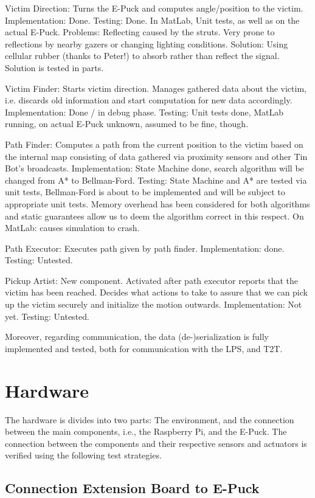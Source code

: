\documentclass[a4paper,parskip,headheight=38pt]{scrartcl} %
\newcommand{\ie}{i.e.}
\begin{document}
Victim Direction:
Turns the E-Puck and computes angle/position to the victim.
Implementation: Done.
Testing: Done. In MatLab, Unit tests, as well as on the actual E-Puck. Problems: Reflecting caused by the struts. Very prone to reflections by nearby gazers or changing lighting conditions. Solution: Using cellular rubber (thanks to Peter!) to absorb rather than reflect the signal. Solution is tested in parts.

Victim Finder: 
Starts victim direction. Manages gathered data about the victim, i.e. discards old information and start computation for new data accordingly.
Implementation: Done / in debug phase. 
Testing: Unit tests done, MatLab running, on actual E-Puck unknown, assumed to be fine, though.

Path Finder: 
Computes a path from the current position to the victim based on the internal map consisting of data gathered via proximity sensors and other Tin Bot's broadcasts.
Implementation: State Machine done, search algorithm will be changed from A* to Bellman-Ford.
Testing: State Machine and A* are tested via unit tests, Bellman-Ford is about to be implemented and will be subject to appropriate unit tests. Memory overhead has been considered for both algorithms and static guarantees allow us to deem the algorithm correct in this respect. On MatLab: causes simulation to crash.

Path Executor:
Executes path given by path finder.
Implementation: done.
Testing: Untested.

Pickup Artist:
New component. Activated after path executor reports that the victim has been reached. Decides what actions to take to assure that we can pick up the victim securely and initialize the motion outwards.
Implementation: Not yet.
Testing: Untested.

Moreover, regarding communication, the data (de-)serialization is fully implemented and tested, both for communication with the LPS, and T2T.

\section{Hardware} 
The hardware is divides into two parts: The environment, and the connection
between the main components, \ie, the Raspberry Pi, and the E-Puck. 
The connection between the components and their respective sensors and actuators
is verified using the following test strategies.

\subsection{Connection Extension Board to E-Puck}
\end{document}

